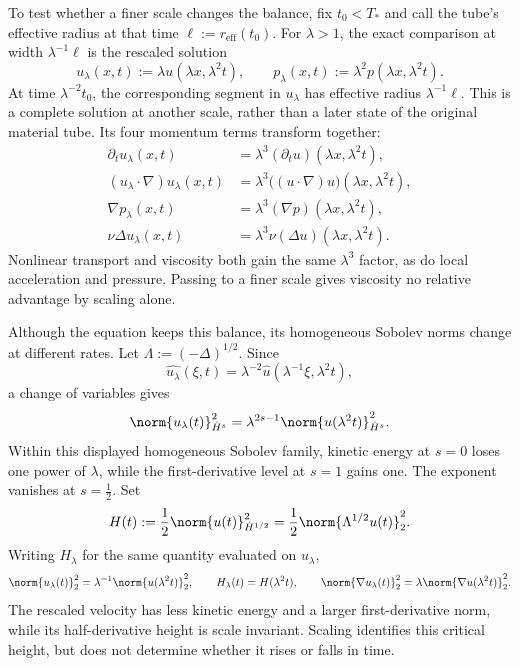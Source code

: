 To test whether a finer scale changes the balance, fix \(t_0<T_*\) and call the tube's effective radius at that time \(\ell:=r_{\mathrm{eff}}(t_0)\).
For \(\lambda>1\), the exact \NavierStokes{} comparison at width \(\lambda^{-1}\ell\) is the rescaled solution
\[
  u_\lambda(x,t)
  :=
  \lambda u(\lambda x,\lambda^2t),
  \qquad
  p_\lambda(x,t)
  :=
  \lambda^2p(\lambda x,\lambda^2t).
\]
At time \(\lambda^{-2}t_0\), the corresponding segment in \(u_\lambda\) has effective radius \(\lambda^{-1}\ell\).
This is a complete solution at another scale, rather than a later state of the original material tube.
Its four momentum terms transform together:
\[
\begin{aligned}
  \partial_tu_\lambda(x,t)
  &=
  \lambda^3(\partial_tu)(\lambda x,\lambda^2t),
  \\
  (u_\lambda\cdot\nabla)u_\lambda(x,t)
  &=
  \lambda^3\bigl((u\cdot\nabla)u\bigr)(\lambda x,\lambda^2t),
  \\
  \nabla p_\lambda(x,t)
  &=
  \lambda^3(\nabla p)(\lambda x,\lambda^2t),
  \\
  \nu\Delta u_\lambda(x,t)
  &=
  \lambda^3\nu(\Delta u)(\lambda x,\lambda^2t).
\end{aligned}
\]
Nonlinear transport and viscosity both gain the same \(\lambda^3\) factor, as do local acceleration and pressure.
Passing to a finer scale gives viscosity no relative advantage by scaling alone.


Although the equation keeps this balance, its homogeneous Sobolev norms change at different rates.
Let \(\Lambda:=(-\Delta)^{1/2}\).
Since
\[
  \widehat{u_\lambda}(\xi,t)
  =
  \lambda^{-2}\widehat u(\lambda^{-1}\xi,\lambda^2t),
\]
a change of variables gives
\[
  \norm{u_\lambda(t)}_{\dot H^s}^2
  =
  \lambda^{2s-1}
  \norm{u(\lambda^2t)}_{\dot H^s}^2.
\]
Within this displayed homogeneous Sobolev family, kinetic energy at \(s=0\) loses one power of \(\lambda\), while the first-derivative level at \(s=1\) gains one.
The exponent vanishes at \(s=\tfrac12\).
Set
\[
  H(t)
  :=
  \frac12\norm{u(t)}_{\dot H^{1/2}}^2
  =
  \frac12\norm{\Lambda^{1/2}u(t)}_2^2.
\]
Writing \(H_\lambda\) for the same quantity evaluated on \(u_\lambda\),
\[
  \norm{u_\lambda(t)}_2^2
  =
  \lambda^{-1}\norm{u(\lambda^2t)}_2^2,
  \qquad
  H_\lambda(t)=H(\lambda^2t),
  \qquad
  \norm{\nabla u_\lambda(t)}_2^2
  =
  \lambda\norm{\nabla u(\lambda^2t)}_2^2.
\]
The rescaled velocity has less kinetic energy and a larger first-derivative norm, while its half-derivative height is scale invariant.
Scaling identifies this critical height, but does not determine whether it rises or falls in time.

